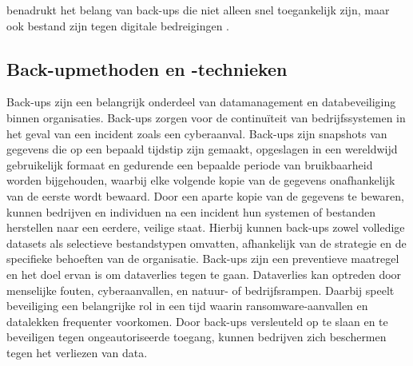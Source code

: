 benadrukt het belang van back-ups die niet alleen snel toegankelijk zijn, maar ook bestand zijn tegen digitale bedreigingen \autocite{Ghazi2013}.

\subsection{Back-upmethoden en -technieken}
Back-ups zijn een belangrijk onderdeel van datamanagement en databeveiliging binnen organisaties. Back-ups zorgen voor de continuïteit van bedrijfssystemen in het geval van een incident zoals een cyberaanval. Back-ups zijn snapshots van gegevens die op een bepaald tijdstip zijn gemaakt, opgeslagen in een wereldwijd gebruikelijk formaat en gedurende een bepaalde periode van bruikbaarheid worden bijgehouden, waarbij elke volgende kopie van de gegevens onafhankelijk van de eerste wordt bewaard\autocite{Nelson2011}. Door een aparte kopie van de gegevens te bewaren, kunnen bedrijven en individuen na een incident hun systemen of bestanden herstellen naar een eerdere, veilige staat. Hierbij kunnen back-ups zowel volledige datasets als selectieve bestandstypen omvatten, afhankelijk van de strategie en de specifieke behoeften van de organisatie. Back-ups zijn een preventieve maatregel en het doel ervan is om dataverlies tegen te gaan. Dataverlies kan optreden door menselijke fouten, cyberaanvallen, en natuur- of bedrijfsrampen. Daarbij speelt beveiliging een belangrijke rol in een tijd waarin ransomware-aanvallen en datalekken frequenter voorkomen. Door back-ups versleuteld op te slaan en te beveiligen tegen ongeautoriseerde toegang, kunnen bedrijven zich beschermen tegen het verliezen van data. 
